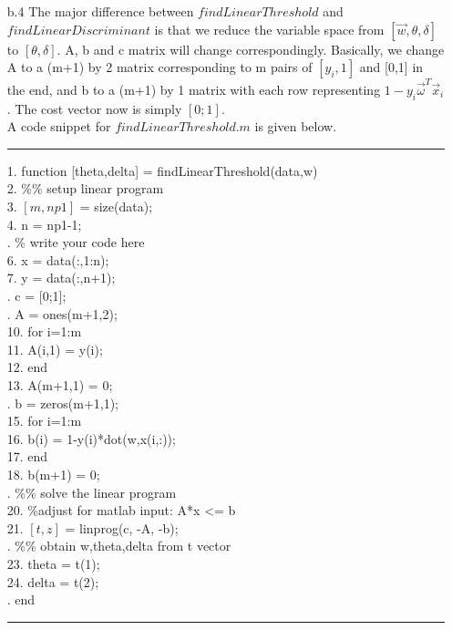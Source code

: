 \begin{enumerate}
\begin{enumerate}
	\item[b.4]
	The major difference between $findLinearThreshold$ and $findLinearDiscriminant$ is that we reduce the variable space from $[\vec{w},\theta,\delta]$ to $[\theta,\delta]$. A, b and c matrix will change correspondingly. Basically, we change A to a (m+1) by 2 matrix corresponding to m pairs of $[y_i, 1]$ and [0,1] in the end, and b to a (m+1) by 1 matrix with each row representing $1-y_i\vec{\omega}^T\vec{x}_i$. The cost vector now is simply $[0;1]$.\\
	A code snippet for $findLinearThreshold.m$ is given below.\\
	\noindent\rule[0.5ex]{\linewidth}{1pt}
	1.	function [theta,delta] = findLinearThreshold(data,w)\\
	2.	{\color{blue}\%\% setup linear program}\\
	3.	$[m, np1]$ = size(data);\\
	4.	n = np1-1;\\
	.	{\color{blue}\% write your code here}\\
	6.	x = data(:,1:n);\\
	7.	y = data(:,n+1);\\
	.	c = [0;1];\\
	.	A = ones(m+1,2);\\
	10.	for i=1:m\\
    	11.	\qquad A(i,1) = y(i);\\
	12.	end\\
	13.	A(m+1,1) = 0;\\
	.	b = zeros(m+1,1);\\
	15.	for i=1:m\\
    	16.	\qquad b(i) = 1-y(i)*dot(w,x(i,:));\\
	17.	end    \\
	18.	b(m+1) = 0;\\
	.	{\color{blue}\%\% solve the linear program}\\
	20.	{\color{blue}\%adjust for matlab input: A*x <= b}\\
	21.	$[t, z]$ = linprog(c, -A, -b);\\
	.	{\color{blue}\%\% obtain w,theta,delta from t vector}\\
	23.	theta = t(1);\\
	24.	delta = t(2);\\
	.	end\\
	\noindent\rule[0.5ex]{\linewidth}{1pt}
	

\end{enumerate}
\end{enumerate}
